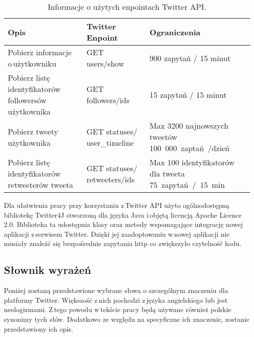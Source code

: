 \begin{table}[!h] \label{tab:endointytwitter} \centering
\caption{Informacje o użytych enpointach Twitter API.}
\begin{tabular} { | m{} | m{}| m{} | } \hline
Opis & Twitter Enpoint & Ograniczenia \\  \hline \hline
Pobierz informacje o\,użytkowniku & GET users/show & 900 zapytań / 15 minut \\ \hline
Pobierz listę identyfikatorów followersów \mbox{użytkownika} & GET followers/ids & 15 zapytań / 15 minut \\ \hline
Pobierz tweety użytkownika & GET statuses/ user\_timeline & Max 3200 najnowszych tweetów \mbox{100 000 zaptań /dzień} \\ \hline
Pobierz listę identyfikatorów retweeterów tweeta & GET statuses/ retweeters/ids & Max 100 identyfikatorów dla tweeta \mbox{75 zapytań / 15 min} 
 \\ \hline
\end{tabular}
\end{table}

Dla ułatwienia pracy przy korzystaniu z\,Twitter API użyto ogólnodostępną bibliotekę Twitter4J  stworzoną dla języka Java i\,objętą licencją Apache Licence 2.0. Biblioteka ta udostępnia klasy oraz metody wspomagające integrację nowej aplikacji z\,serwisem Twitter. Dzięki jej zaadoptowaniu w\,nowej aplikacji nie musiały znaleźć się bezpośrednie zapytania http co zwiększyło czytelność kodu. 

\subsection{Słownik wyrażeń}
Poniżej zostaną przedstawione wybrane słowa o szczególnym znaczeniu dla platformy Twitter. Większość z\,nich pochodzi z\,języka angielskiego lub jest neologizmami. Z\,tego powodu w\,tekście pracy będą używane również polskie synonimy tych słów. Dodatkowo ze względu na specyficzne ich znaczenie, zostanie przedstawiony ich opis.

